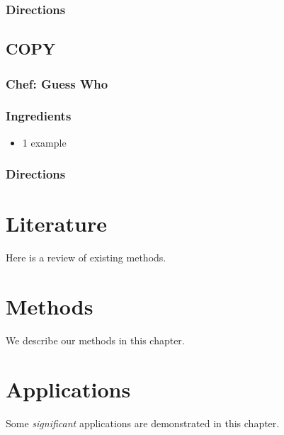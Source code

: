 \documentclass[
]{book}
\providecommand{\tightlist}{%
  \setlength{\itemsep}{0pt}\setlength{\parskip}{0pt}}
\begin{document}
\hypertarget{directions-24}{%
\subsection*{Directions}\label{directions-24}}


\hypertarget{copy}{%
\section*{COPY}\label{copy}}


\hypertarget{chef-guess-who}{%
\subsection*{Chef: Guess Who}\label{chef-guess-who}}


\hypertarget{ingredients-25}{%
\subsection*{Ingredients}\label{ingredients-25}}


\begin{itemize}
\tightlist
\item
  1 example
\end{itemize}

\hypertarget{directions-25}{%
\subsection*{Directions}\label{directions-25}}


\hypertarget{literature}{%
\chapter{Literature}\label{literature}}

Here is a review of existing methods.

\hypertarget{methods}{%
\chapter{Methods}\label{methods}}

We describe our methods in this chapter.

\hypertarget{applications}{%
\chapter{Applications}\label{applications}}

Some \emph{significant} applications are demonstrated in this chapter.
\end{document}
